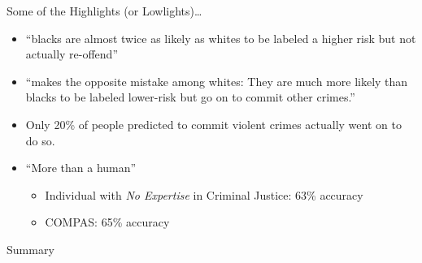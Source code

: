 \documentclass[11pt,dvipsnames,usenames,aspectratio=169]{beamer}  %
\begin{document}
\begin{frame}{Some of the Highlights (or Lowlights)\ldots}
  \noindent

  \begin{itemize}[<+->]
    \setlength{\itemsep}{12pt}
    \item ``blacks are almost twice as likely as whites to be labeled a higher risk but not actually re-offend''

    \item ``makes the opposite mistake among whites: They are much more likely than blacks to be labeled lower-risk but go on to commit other crimes.''

    \item Only 20\% of people predicted to commit violent crimes actually went on to do so.

    \item ``More  than a human''~\citep{Dressel:2018}
      \begin{itemize}[<+->]
        \item Individual with \textit{No Expertise} in Criminal Justice: 63\% accuracy
        \item COMPAS: 65\% accuracy
      \end{itemize}
  \end{itemize}

\end{frame}

\begin{frame}{Summary}

  \vspace{16pt}
\end{frame}
\end{document}
